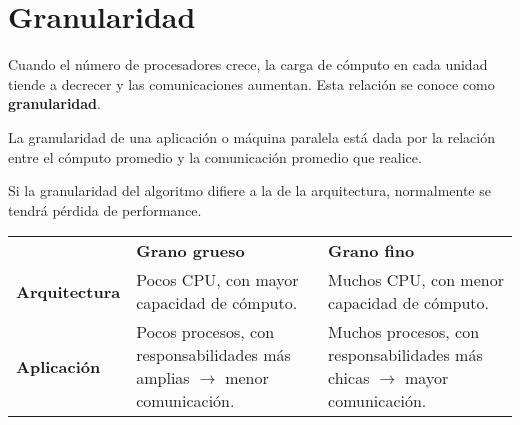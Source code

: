 \documentclass[a4paper, 10pt]{report}
\begin{document}
\section{Granularidad}

Cuando el número de procesadores crece, la carga de cómputo en cada unidad tiende a decrecer y las comunicaciones aumentan. Esta relación se conoce como \textbf{granularidad}.

La granularidad de una aplicación o máquina paralela está dada por la relación entre el cómputo promedio y la comunicación promedio que realice.

Si la granularidad del algoritmo difiere a la de la arquitectura, normalmente se tendrá pérdida de performance.

{\renewcommand{\arraystretch}{2}%
\begin{center}
\begin{tabular}{p{3cm} p{6cm} p{6cm}}
& \textbf{Grano grueso} & \textbf{Grano fino} \\
\textbf{Arquitectura} & Pocos CPU, con mayor capacidad de cómputo. & Muchos CPU, con menor capacidad de cómputo. \\
\hline
\textbf{Aplicación} & Pocos procesos, con responsabilidades más amplias $\rightarrow$ menor comunicación. & Muchos procesos, con responsabilidades más chicas $\rightarrow$ mayor comunicación. \\
\end{tabular}
\end{center}}
\end{document}
